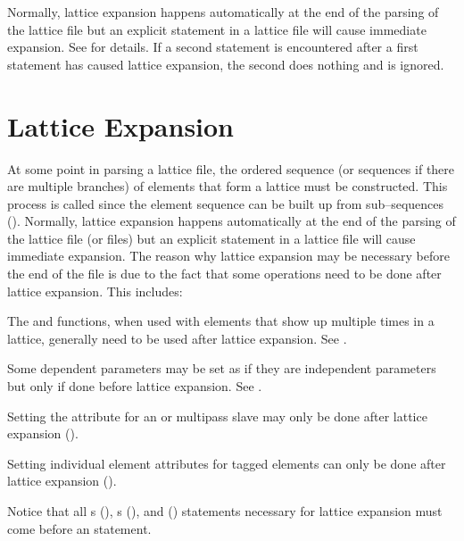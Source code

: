 {{{Normally, lattice expansion happens automatically at the end of the parsing of the lattice file but
an explicit  statement in a lattice file will cause immediate expansion. See
 for details. If a second  statement is encountered after a first
 statement has caused lattice expansion, the second  does
nothing and is ignored.

\section{Lattice Expansion}
\label{s:expand}

At some point in parsing a lattice file, the ordered sequence (or sequences if there are multiple
branches) of elements that form a lattice must be constructed. This process is called  since the element sequence can be built up from sub--sequences
(). Normally, lattice expansion happens automatically at the end of the parsing of
the lattice file (or files) but an explicit  statement in a lattice file will cause
immediate expansion. The reason why lattice expansion may be necessary before the end of the file is
due to the fact that some operations need to be done after lattice expansion. This includes:
\begin{Itemize}
\item 
{}
The  and  functions, when used with elements
that show up multiple times in a lattice, generally need to be used
after lattice expansion. See .
\item
Some dependent parameters may be set as if they are independent
parameters but only if done before lattice expansion. See .
\item 
Setting the  attribute for an 
 or  multipass
slave may only be done after lattice expansion ().
\item
{}
Setting individual element attributes for tagged elements can only be done
after lattice expansion ().
\end{Itemize}

Notice that all s (), s (), and 
() statements necessary for lattice expansion must come before an 
statement.

}}}
